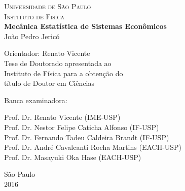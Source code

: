 \PassOptionsToPackage{hyphens}{url}\documentclass[
  twoside,
  11pt, a4paper,
  footinclude=true,
  headinclude=true,
  cleardoublepage=empty
]{scrbook}
\begin{document}
\begin{titlepage}
  \begin{center}

    \textsc{\Large Universidade de São Paulo} \\[0.1cm]
    \textsc{\Large Instituto de Física} \\ [4cm]
    
{\Large \textbf{Mecânica Estatística de Sistemas Econômicos}} \\ [1cm]

{\Large João Pedro Jericó} \\[3cm]
  \end{center}


  \begin{flushleft}
  \hspace{9cm} Orientador: Renato Vicente \\ [1cm] 
\hspace{8cm}    Tese de Doutorado apresentada ao \\ \hspace{8cm}  Instituto de
Física para a
    obtenção do \\ \hspace{8cm}  título de Doutor em Ciências
  \end{flushleft}
\vspace{1cm}

\begin{flushleft}
Banca examinadora:

Prof. Dr. Renato Vicente (IME-USP) \\
Prof. Dr. Nestor Felipe Caticha Alfonso (IF-USP) \\
Prof. Dr. Fernando Tadeu Caldeira Brandt (IF-USP) \\ 
Prof. Dr. André Cavalcanti Rocha Martins (EACH-USP) \\
Prof. Dr. Masayuki Oka Hase (EACH-USP) \\
\end{flushleft}

\vfill

\begin{center}
  {\large São Paulo} \\
{\large 2016}
\end{center}
\end{titlepage}





% 

\end{document}
